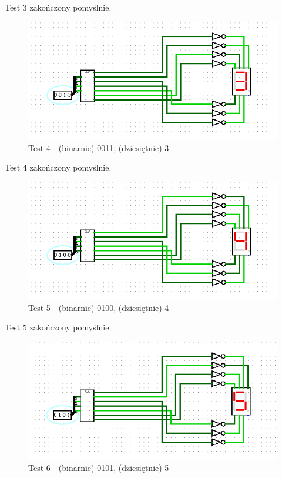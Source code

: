 Test 3 zakończony pomyślnie.

\begin{figure}[H]
    \includegraphics[width=\linewidth]{ScreenshotsTests/Comp 1/Comp 1_00006.png}
    \caption{Test 4 - (binarnie) 0011, (dziesiętnie) 3}
    \label{fig:test3}
\end{figure}

Test 4 zakończony pomyślnie.

\begin{figure}[H]
    \includegraphics[width=\linewidth]{ScreenshotsTests/Comp 1/Comp 1_00005.png}
    \caption{Test 5 - (binarnie) 0100, (dziesiętnie) 4}
    \label{fig:test4}
\end{figure}

Test 5 zakończony pomyślnie.

\begin{figure}[H]
    \includegraphics[width=\linewidth]{ScreenshotsTests/Comp 1/Comp 1_00004.png}
    \caption{Test 6 - (binarnie) 0101, (dziesiętnie) 5}
    \label{fig:test5}
\end{figure}

